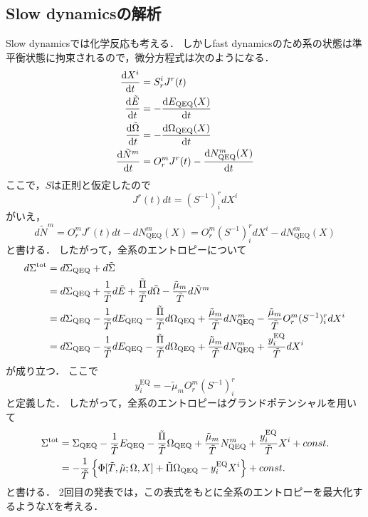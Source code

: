 \documentclass[a4paper,11pt]{jsarticle}
\theoremstyle{definition}
\begin{document}
\subsection{Slow dynamicsの解析}
Slow dynamicsでは化学反応も考える．
しかしfast dynamicsのため系の状態は準平衡状態に拘束されるので，微分方程式は次のようになる．
\begin{align}
  \dv{X^i}{t} &= S^i_r J^r(t) \\
  \dv{\tilde{E}}{t} &= - \dv{E_{\mathrm{QEQ}}(X)}{t} \\
  \dv{\tilde{\Omega}}{t} &= - \dv{\Omega_{\mathrm{QEQ}}(X)}{t} \\
  \dv{\tilde{N}^m}{t} &= O^m_r J^r(t) - \dv{N^m_{\mathrm{QEQ}}(X)}{t}
\end{align}
ここで，$S$は正則と仮定したので
\begin{equation}
  J^r(t) dt = (S^{-1})^r_i dX^i 
\end{equation}
がいえ，
\begin{equation}
  d\tilde{N}^m = O^m_r J^r(t) dt - dN^m_{\mathrm{QEQ}}(X) = O^m_r (S^{-1})^r_i dX^i - dN^m_{\mathrm{QEQ}}(X)
\end{equation}
と書ける．
したがって，全系のエントロピーについて
\begin{align}
  d\Sigma^{\mathrm{tot}} &= d\Sigma_{\mathrm{QEQ}} + d\tilde{\Sigma} \notag\\
  &= d\Sigma_{\mathrm{QEQ}} + \frac{1}{\tilde{T}} d\tilde{E} + \frac{\tilde{\Pi}}{\tilde{T}} d\tilde{\Omega} - \frac{\tilde{\mu}_m}{\tilde{T}} d\tilde{N}^m \notag\\
  &= d\Sigma_{\mathrm{QEQ}} - \frac{1}{\tilde{T}} dE_{\mathrm{QEQ}} - \frac{\tilde{\Pi}}{\tilde{T}} d\Omega_{\mathrm{QEQ}} + \frac{\tilde{\mu}_m}{\tilde{T}} dN^m_{\mathrm{QEQ}} - \frac{\tilde{\mu}_m}{\tilde{T}} O^m_r (S^{-1})^r_i dX^i \notag\\
  &= d\Sigma_{\mathrm{QEQ}} - \frac{1}{\tilde{T}} dE_{\mathrm{QEQ}} - \frac{\tilde{\Pi}}{\tilde{T}} d\Omega_{\mathrm{QEQ}} + \frac{\tilde{\mu}_m}{\tilde{T}} dN^m_{\mathrm{QEQ}} + \frac{y_i^{\mathrm{EQ}}}{\tilde{T}} dX^i 
\end{align}
が成り立つ．
ここで
\begin{equation}
  y_i^{\mathrm{EQ}} = - \tilde{\mu}_m O^m_r (S^{-1})^r_i
\end{equation}
と定義した．
したがって，全系のエントロピーはグランドポテンシャルを用いて
\begin{align}
  \Sigma^{\mathrm{tot}} &= \Sigma_{\mathrm{QEQ}} - \frac{1}{\tilde{T}} E_{\mathrm{QEQ}} - \frac{\tilde{\Pi}}{\tilde{T}} \Omega_{\mathrm{QEQ}} + \frac{\tilde{\mu}_m}{\tilde{T}} N^m_{\mathrm{QEQ}} + \frac{y_i^{\mathrm{EQ}}}{\tilde{T}} X^i + const. \notag\\
  &= - \frac{1}{\tilde{T}} \left\{ \Phi[\tilde{T}, \tilde{\mu}; \Omega, X] + \tilde{\Pi}\Omega_{\mathrm{QEQ}} - y_i^{\mathrm{EQ}} X^i \right\} + const.
\end{align}
と書ける．
2回目の発表では，この表式をもとに全系のエントロピーを最大化するような$X$を考える．
\end{document}
